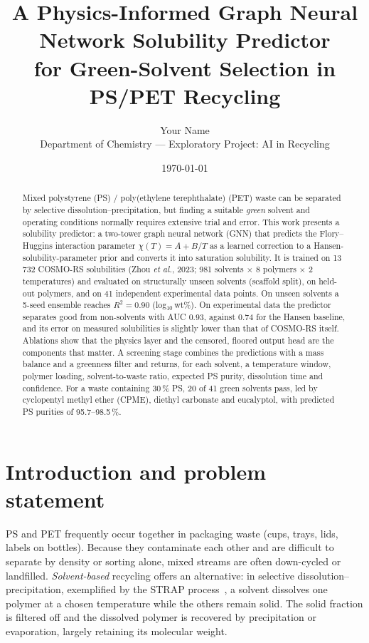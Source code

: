 \documentclass[11pt,a4paper]{article}
\title{\textbf{A Physics-Informed Graph Neural Network Solubility Predictor\\
for Green-Solvent Selection in PS/PET Recycling}}
\author{Your Name\\[2pt] \small Department of Chemistry --- Exploratory Project: AI in Recycling}
\date{\today}
\newcommand{\wt}{wt\%}
\begin{document}
\maketitle

\begin{abstract}
Mixed polystyrene (PS) / poly(ethylene terephthalate) (PET) waste can be separated by selective
dissolution--precipitation, but finding a suitable \emph{green} solvent and operating conditions
normally requires extensive trial and error. This work presents a solubility predictor: a two-tower
graph neural network (GNN) that predicts the Flory--Huggins interaction parameter $\chi(T)=A+B/T$ as a
learned correction to a Hansen-solubility-parameter prior and converts it into saturation solubility.
It is trained on 13\,732 COSMO-RS solubilities (Zhou \emph{et al.}, 2023; 981 solvents $\times$ 8
polymers $\times$ 2 temperatures) and evaluated on structurally unseen solvents (scaffold split), on
held-out polymers, and on 41 independent experimental data points. On unseen solvents a 5-seed ensemble
reaches $R^2=0.90$ (log$_{10}$\,\wt). On experimental data the predictor separates good from
non-solvents with AUC 0.93, against 0.74 for the Hansen baseline, and its error on measured
solubilities is slightly lower than that of COSMO-RS itself. Ablations show that the physics layer and
the censored, floored output head are the components that matter. A screening stage combines the
predictions with a mass balance and a greenness filter and returns, for each solvent, a temperature
window, polymer loading, solvent-to-waste ratio, expected PS purity, dissolution time and confidence.
For a waste containing 30\,\% PS, 20 of 41 green solvents pass, led by cyclopentyl methyl ether (CPME),
diethyl carbonate and eucalyptol, with predicted PS purities of 95.7--98.5\,\%.
\end{abstract}

\section{Introduction and problem statement}
PS and PET frequently occur together in packaging waste (cups, trays, lids, labels on bottles). Because
they contaminate each other and are difficult to separate by density or sorting alone, mixed streams are
often down-cycled or landfilled. \emph{Solvent-based} recycling offers an alternative: in selective
dissolution--precipitation, exemplified by the STRAP process~\cite{strap}, a solvent dissolves one polymer
at a chosen temperature while the others remain solid. The solid fraction is filtered off and the
dissolved polymer is recovered by precipitation or evaporation, largely retaining its molecular weight.
\end{document}
